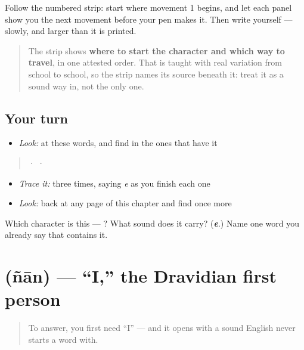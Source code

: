 Follow the numbered strip: start where movement 1 begins, and let each panel show you the next movement before your pen makes it. Then write  yourself — slowly, and larger than it is printed.

\begin{quote}
The strip shows \textbf{where to start the character and which way to travel}, in one attested order. That is taught with real variation from school to school, so the strip names its source beneath it: treat it as a sound way in, not the only one.
\end{quote}

\subsection*{Your turn}
\begin{itemize}
\raggedright
  \item \emph{Look:} at these words, and find  in the ones that have it
\end{itemize}

\begin{quote}
  ·    ·  
\end{quote}

\begin{itemize}
\raggedright
  \item \emph{Trace it:}  three times, saying \emph{e} as you finish each one
  \item \emph{Look:} back at any page of this chapter and find  once more
\end{itemize}

\begin{tcolorbox}[breakable,colback=teal!4,colframe=teal!35!black,title={Before you move on}]
Which character is this — ? What sound does it carry? (\emph{\textbf{e}}.) Name one word you already say that contains it.
\end{tcolorbox}
\section[\texorpdfstring{\ml{ഞാൻ} (ñān)}{ഞാൻ (ñān)}]{ (ñān) — \textquotedblleft{}I,\textquotedblright{} the Dravidian first person}

\label{lesson:ML-C03-njaan}



\begin{quote}
To answer, you first need \textquotedblleft{}I\textquotedblright{} — and it opens with a sound English never starts a word with.
\end{quote}

